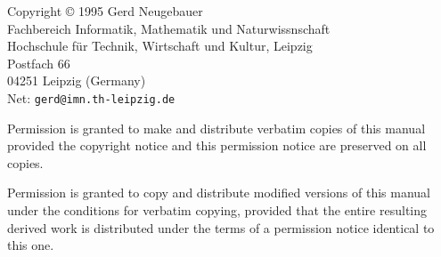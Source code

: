 \let\PrologFILE=\relax
\let\PredicateFileExtension=\relax

\newcommand\eclipse{ECL\(^i\)PS\(^e\)}
\newcommand\CaPrI{CaPrI}
\newcommand\ProCom{ProCom}
\newcommand\ProTop{{Pro\hspace{-.1em}Top}}

\newfont{}

\newenvironment{BoxedSample}%
{\begin{Sbox} \begin{minipage}{.8\textwidth}\obeylines\obeyspaces\itt%
}{%
 \end{minipage} \end{Sbox}%
 \begin{center}%
  \cornersize*{3ex}%
  \Ovalbox{\mbox{\TheSbox}}
 \end{center}%
}

\renewcommand\textfraction{.1}
\renewcommand\topfraction{1}
\renewcommand\bottomfraction{1}

\makeindex
\initfloatingfigs

\maketitle
Copyright {\copyright} 1995 Gerd Neugebauer\\[.5\baselineskip]
{\small	Fachbereich Informatik, Mathematik und Naturwissnschaft
\\	Hochschule f{\"u}r Technik, Wirtschaft und Kultur, Leipzig
\\      Postfach 66
\\      04251 Leipzig (Germany)
\\      Net: {\tt gerd@imn.th-leipzig.de}
}
\vfill

Permission is granted  to make and  distribute verbatim copies of  this manual
provided the copyright notice and this permission  notice are preserved on all
copies.


Permission is granted to copy and distribute  modified versions of this manual
under the conditions for verbatim  copying, provided that the entire resulting
derived work is distributed  under the terms of  a permission notice identical
to this one.

